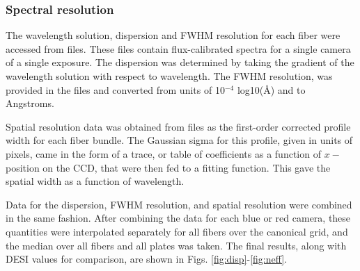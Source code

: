 \subsubsection{Spectral resolution}

The wavelength solution, dispersion and FWHM resolution for each fiber were accessed from  files. These files contain flux-calibrated spectra for a single camera of a single exposure. The dispersion was determined by taking the gradient of the wavelength solution with respect to wavelength. The FWHM resolution, was provided in the files and converted from units of 10$^{-4}$ log10($\mbox{\AA}$) and to Angstroms.

Spatial resolution data was obtained from  files as the first-order corrected profile width for each fiber bundle. The Gaussian sigma for this profile, given in units of pixels, came in the form of a trace, or table of coefficients as a function of $x-$position on the CCD, that were then fed to a fitting function. This gave the spatial width as a function of wavelength.

Data for the dispersion, FWHM resolution, and spatial resolution were combined in the same fashion. After combining the data for each blue or red camera, these quantities were interpolated separately for all fibers over the canonical grid, and the median over all fibers and all plates was taken. The final results, along with DESI values for comparison, are shown in Figs. \ref{fig:disp}-\ref{fig:neff}.


